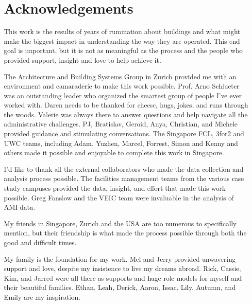 \chapter{Acknowledgements}

This work is the results of years of rumination about buildings and what might make the biggest impact in understanding the way they are operated. This end goal is important, but it is not as meaningful as the process and the people who provided support, insight and love to help achieve it. 

The Architecture and Building Systems Group in Zurich provided me with an environment and camaraderie to make this work possible. Prof. Arno Schlueter was an outstanding leader who organized the smartest group of people I've ever worked with. Daren needs to be thanked for cheese, hugs, jokes, and runs through the woods. Valerie was always there to answer questions and help navigate all the administrative challenges. PJ, Bratislav, Geroid, Anya, Christian, and Michele provided guidance and stimulating conversations. The Singapore FCL, 3for2 and UWC teams, including Adam, Yuzhen, Marcel, Forrest, Simon and Kenny and others made it possible and enjoyable to complete this work in Singapore. 

I'd like to thank all the external collaborators who made the data collection and analysis process possible. The facilities management teams from the various case study campuses provided the data, insight, and effort that made this work possible. Greg Fanslow and the VEIC team were invaluable in the analysis of AMI data.

My friends in Singapore, Zurich and the USA are too numerous to specifically mention, but their friendship is what made the process possible through both the good and difficult times. 

My family is the foundation for my work. Mel and Jerry provided unwavering support and love, despite my insistence to live my dreams abroad. Rick, Cassie, Kim, and Jarred were all there as supports and huge role models for myself and their beautiful families. Ethan, Leah, Derick, Aaron, Issac, Lily, Autumn, and Emily are my inspiration. 
